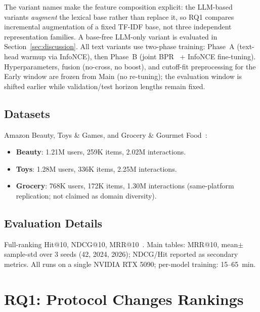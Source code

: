 \documentclass[sigconf,natbib=true,anonymous]{acmart}
\newcommand{\tfidf}{\textsc{TF-IDF}\xspace}
\begin{document}
The variant names make the feature composition explicit: the LLM-based variants \emph{augment} the lexical base rather than replace it, so RQ1 compares incremental augmentation of a fixed \tfidf base, not three independent representation families.
A base-free LLM-only variant is evaluated in Section~\ref{sec:discussion}.
All text variants use two-phase training: Phase~A (text-head warmup via InfoNCE), then Phase~B (joint BPR~\cite{rendle2009bpr} + InfoNCE fine-tuning).
Hyperparameters, fusion (no-cross, no boost), and cutoff-fit preprocessing for the Early window are frozen from Main (no re-tuning); the evaluation window is shifted earlier while validation/test horizon lengths remain fixed.

\subsection{Datasets}

Amazon Beauty, Toys \& Games, and Grocery \& Gourmet Food~\cite{mcauley2015amazon,ni2019amazon}:
\begin{itemize}[leftmargin=*,itemsep=1pt]
\item \textbf{Beauty}: 1.21M users, 259K items, 2.02M interactions.
\item \textbf{Toys}: 1.28M users, 336K items, 2.25M interactions.
\item \textbf{Grocery}: 768K users, 172K items, 1.30M interactions (same-platform replication; not claimed as domain diversity).
\end{itemize}

\subsection{Evaluation Details}

Full-ranking Hit@10, NDCG@10, MRR@10~\cite{krichene2020sampledmetrics}.
Main tables: MRR@10, mean$\pm$sample-std over 3 seeds (42, 2024, 2026); NDCG/Hit reported as secondary metrics.
All runs on a single NVIDIA RTX 5090; per-model training: 15--65~min.

\section{RQ1: Protocol Changes Rankings}
\label{sec:rq1}
\end{document}
